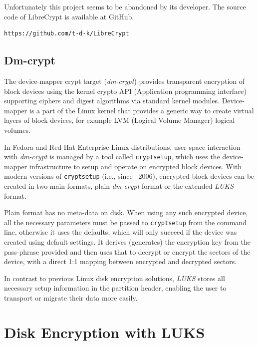 Unfortunately this project seems to be abandoned by its developer.
The source code of LibreCrypt is available at GitHub.
\begin{lstlisting}[columns=fixed,basicstyle=\ttfamily\footnotesize,tabsize=4,backgroundcolor=\color{yellow!10}]
https://github.com/t-d-k/LibreCrypt
\end{lstlisting}



\subsection{Dm-crypt}\label{dm-crypt}

The device-mapper crypt target ({\it dm-crypt}) provides transparent encryption of block devices using the kernel crypto API (Application programming interface) supporting ciphers and digest algorithms via standard kernel modules.
Device-mapper is a part of the Linux kernel that provides a generic way to create virtual layers of block devices, for example LVM (Logical Volume Manager) logical volumes.

In Fedora and Red Hat Enterprise Linux distributions, user-space interaction with {\it dm-crypt} is managed by a tool called {\tt cryptsetup}, which uses the device-mapper infrastructure to setup and operate on encrypted block devices.
With modern versions of {\tt cryptsetup} (i.e., since ~2006), encrypted block devices can be created in two main formats, plain {\it dm-crypt} format or the extended {\it LUKS} format.

Plain format has no meta-data on disk.
When using any such encrypted device, all the necessary parameters must be passed to {\tt cryptsetup} from the command line, otherwise it uses the defaults, which will only succeed if the device was created using default settings.
It derives (generates) the encryption key from the pass-phrase provided and then uses that to decrypt or encrypt the sectors of the device, with a direct 1:1 mapping between encrypted and decrypted sectors.

In contrast to previous Linux disk encryption solutions, {\it LUKS} stores all necessary setup information in the partition header, enabling the user to transport or migrate their data more easily.



\section{Disk Encryption with LUKS}\label{LUKS}

